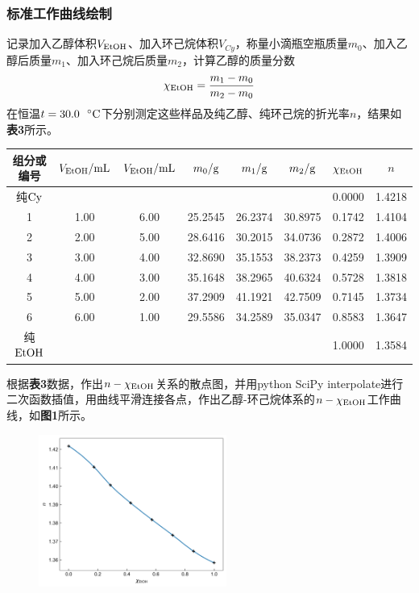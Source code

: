 \documentclass[12pt]{article}
\begin{document}
\subsubsection{标准工作曲线绘制}
记录加入乙醇体积$V_{\rm EtOH}$、加入环己烷体积$V_{Cy}$，称量小滴瓶空瓶质量$m_{0}$、加入乙醇后质量$m_{1}$、加入环己烷后质量$m_{2}$，计算乙醇的质量分数
$$
\chi_{\ce{EtOH}}=\frac{m_{1}-m_{0}}{m_{2}-m_{0}}
$$
在恒温$t=30.0\ \ {\rm ^{\circ}C}$下分别测定这些样品及纯乙醇、纯环己烷的折光率$n$，结果如\textbf{表3}所示。	
\begin{table}[h]
	\centering
	\begin{tabular}{cccccccc}
		\toprule
		组分或编号 & $V_{\rm EtOH}/{\rm mL}$ & $V_{\rm EtOH}/{\rm mL}$ & $m_{0}/{\rm g}$ &$m_{1}/{\rm g}$&$m_{2}/{\rm g}$& $\chi_{\ce{EtOH}}$&$n$ \\
		\midrule
		纯$\rm Cy$   &      &      &         &         &         & 0.0000 & 1.4218 \\
		1     & 1.00 & 6.00 & 25.2545 & 26.2374 & 30.8975 & 0.1742 & 1.4104 \\
		2     & 2.00 & 5.00 & 28.6416 & 30.2015 & 34.0736 & 0.2872 & 1.4006 \\
		3     & 3.00 & 4.00 & 32.8690 & 35.1553 & 38.2373 & 0.4259 & 1.3909 \\
		4     & 4.00 & 3.00 & 35.1648 & 38.2965 & 40.6324 & 0.5728 & 1.3818 \\
		5     & 5.00 & 2.00 & 37.2909 & 41.1921 & 42.7509 & 0.7145 & 1.3734 \\
		6     & 6.00 & 1.00 & 29.5586 & 34.2589 & 35.0347 & 0.8583 & 1.3647 \\
		纯${\rm EtOH}$ &      &      &         &         &         & 1.0000 & 1.3584\\
		\bottomrule
	\end{tabular}
\end{table}
\par

根据\textbf{表3}数据，作出$n-\chi_{\ce{EtOH}}$关系的散点图，并用python SciPy interpolate进行二次函数插值，用曲线平滑连接各点，作出乙醇-环己烷体系的$n-\chi_{\ce{EtOH}}$工作曲线，如\textbf{图1}所示。
\begin{figure}[h]
	\centering
	\includegraphics[width=0.55\textwidth]{1.jpg}
\end{figure}
\par
\end{document}

